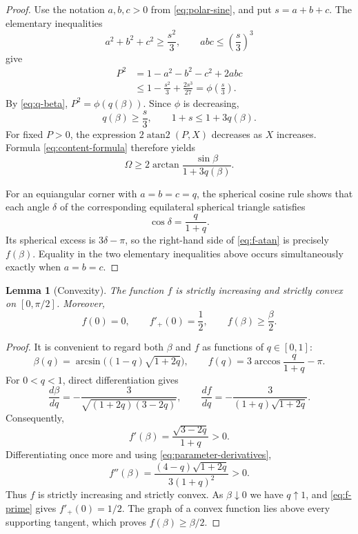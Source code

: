 \documentclass[11pt,a4paper]{article}
\newtheorem{lemma}[theorem]{Lemma}
\theoremstyle{definition}
\theoremstyle{remark}
\newcommand{\atanTwo}{\operatorname{atan2}}
\begin{document}
\begin{proof}
Use the notation $a,b,c>0$ from \eqref{eq:polar-sine}, and put
$s=a+b+c$.  The elementary inequalities
\[
 a^2+b^2+c^2\geq\frac{s^2}{3},
 \qquad
 abc\leq\left(\frac{s}{3}\right)^3
\]
give
\begin{align*}
 P^2
 &=1-a^2-b^2-c^2+2abc\\
 &\leq1-\frac{s^2}{3}+\frac{2s^3}{27}
 =\phi\left(\frac{s}{3}\right).
\end{align*}
By \eqref{eq:q-beta}, $P^2=\phi(q(\beta))$.  Since $\phi$ is decreasing,
\[
 q(\beta)\geq\frac{s}{3},
 \qquad
 1+s\leq1+3q(\beta).
\]
For fixed $P>0$, the expression $2\atanTwo(P,X)$ decreases as $X$
increases.  Formula \eqref{eq:content-formula} therefore yields
\begin{equation}\label{eq:f-atan}
 \Omega
 \geq
 2\arctan\frac{\sin\beta}{1+3q(\beta)}.
\end{equation}

For an equiangular corner with $a=b=c=q$, the spherical cosine rule shows
that each angle $\delta$ of the corresponding equilateral spherical triangle
satisfies
\[
 \cos\delta=\frac{q}{1+q}.
\]
Its spherical excess is $3\delta-\pi$, so the right-hand side of
\eqref{eq:f-atan} is precisely $f(\beta)$.  Equality in the two elementary
inequalities above occurs simultaneously exactly when $a=b=c$.
\end{proof}

\begin{lemma}[Convexity]\label{lem:convexity}
The function $f$ is strictly increasing and strictly convex on
$[0,\pi/2]$.  Moreover,
\begin{equation}\label{eq:linear-bound}
 f(0)=0,\qquad f'_+(0)=\frac12,\qquad
 f(\beta)\geq\frac{\beta}{2}.
\end{equation}
\end{lemma}

\begin{proof}
It is convenient to regard both $\beta$ and $f$ as functions of
$q\in[0,1]$:
\[
 \beta(q)=\arcsin\bigl((1-q)\sqrt{1+2q}\bigr),
 \qquad
 f(q)=3\arccos\frac{q}{1+q}-\pi.
\]
For $0<q<1$, direct differentiation gives
\begin{equation}\label{eq:parameter-derivatives}
 \frac{d\beta}{dq}
 =-\frac{3}{\sqrt{(1+2q)(3-2q)}},
 \qquad
 \frac{df}{dq}
 =-\frac{3}{(1+q)\sqrt{1+2q}}.
\end{equation}
Consequently,
\begin{equation}\label{eq:f-prime}
 f'(\beta)=\frac{\sqrt{3-2q}}{1+q}>0.
\end{equation}
Differentiating once more and using \eqref{eq:parameter-derivatives},
\begin{equation}\label{eq:f-second}
 f''(\beta)
 =\frac{(4-q)\sqrt{1+2q}}{3(1+q)^2}>0.
\end{equation}
Thus $f$ is strictly increasing and strictly convex.  As $\beta\downarrow0$
we have $q\uparrow1$, and \eqref{eq:f-prime} gives $f'_+(0)=1/2$.
The graph of a convex function lies above every supporting tangent, which
proves $f(\beta)\geq\beta/2$.
\end{proof}
\end{document}
